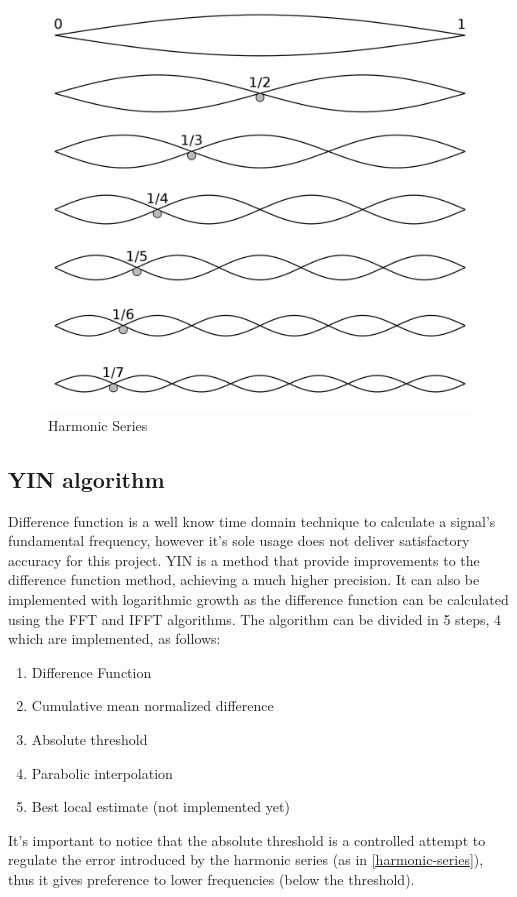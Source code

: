 \begin{figure}[htb]
	\caption{Harmonic Series}
  \label{harmonic-series}
	\begin{center}
    \includegraphics[scale=0.15]{images/harmonic-series}
	\end{center}
\end{figure}

\subsection{YIN algorithm}
Difference function is a well know time domain technique to calculate a signal's fundamental
frequency, however it's sole usage does not deliver satisfactory accuracy for this project.
YIN \cite{YINArticle} is a method that provide improvements to the difference function method, achieving
a much higher precision. It can also be implemented with logarithmic growth as the
difference function can be calculated using the FFT and IFFT algorithms. The algorithm
can be divided in 5 steps, 4 which are implemented, as follows:
\begin{enumerate}
  \item Difference Function
  \item Cumulative mean normalized difference
  \item Absolute threshold
  \item Parabolic interpolation
  \item Best local estimate (not implemented yet)
\end{enumerate}
It's important to notice that the absolute threshold is a controlled attempt to regulate
the error introduced by the harmonic series (as in \autoref{harmonic-series}),
thus it gives preference to lower frequencies (below the threshold).


